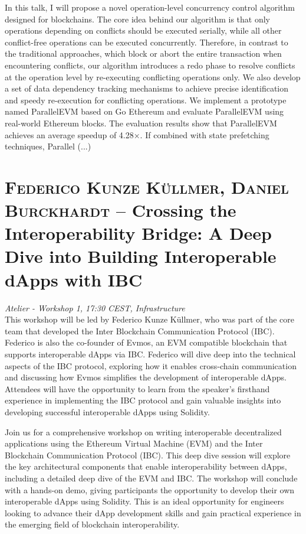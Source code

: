 In this talk, I will propose a novel operation-level concurrency control algorithm designed for blockchains.
The core idea behind our algorithm is that only operations depending on conflicts should be executed serially, while all other conflict-free operations can be executed concurrently. Therefore, in contrast to the traditional approaches, which block or abort the entire transaction when encountering conflicts, our algorithm introduces a redo phase to resolve conflicts at the operation level by re-executing conflicting operations only. We also develop a set of data dependency tracking mechanisms to achieve precise identification and speedy re-execution for conflicting operations. We implement a prototype named ParallelEVM based on Go Ethereum and evaluate ParallelEVM using real-world Ethereum blocks. The evaluation results show that ParallelEVM achieves an average speedup of 4.28×. If combined with state prefetching techniques, Parallel
(...)\clearpage
\section {\textsc{Federico Kunze Küllmer, Daniel Burckhardt} -- Crossing the Interoperability Bridge: A Deep Dive into Building Interoperable dApps with IBC
} \noindent \textit {Atelier - Workshop 1, 17:30 CEST, Infrastructure
}\\[1em] This workshop will be led by Federico Kunze Küllmer, who was part of the core team that developed the Inter Blockchain Communication Protocol (IBC). Federico is also the co-founder of Evmos, an EVM compatible blockchain that supports interoperable dApps via IBC. Federico will dive deep into the technical aspects of the IBC protocol, exploring how it enables cross-chain communication and discussing how Evmos simplifies the development of interoperable dApps. Attendees will have the opportunity to learn from the speaker's firsthand experience in implementing the IBC protocol and gain valuable insights into developing successful interoperable dApps using Solidity.
\par Join us for a comprehensive workshop on writing interoperable decentralized applications using the Ethereum Virtual Machine (EVM) and the Inter Blockchain Communication Protocol (IBC). This deep dive session will explore the key architectural components that enable interoperability between dApps, including a detailed deep dive of the EVM and IBC. The workshop will conclude with a hands-on demo, giving participants the opportunity to develop their own interoperable dApps using Solidity. This is an ideal opportunity for engineers looking to advance their dApp development skills and gain practical experience in the emerging field of blockchain interoperability.
\clearpage
